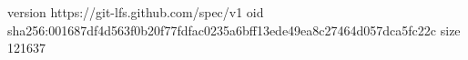 version https://git-lfs.github.com/spec/v1
oid sha256:001687df4d563f0b20f77fdfac0235a6bff13ede49ea8c27464d057dca5fc22c
size 121637

